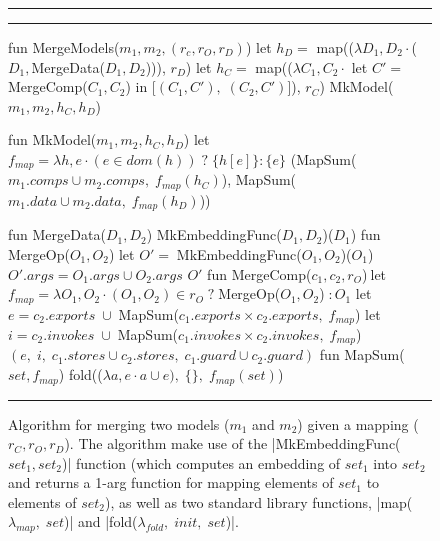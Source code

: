 
\begin{figure}[ht]
\hrule\hrule
\centering
  \begin{slangmath}[numbers=left,emph={MergeModels, MkMap, MkModel,%
                    MergeData, MergeComp, MergeOp, MapSum}]
fun MergeModels($m_1, m_2, (r_c,r_O,r_D)$)
  let $h_D=$ map(($\lambda D_1,D_2 \cdot$($D_1,$MergeData($D_1, D_2$))), $r_D$)
  let $h_C=$ map(($\lambda C_1,C_2 \cdot$ let $C'=\; $MergeComp($C_1, C_2$) in [$(C_1, C'),\; (C_2, C')$]), $r_C$)
  MkModel($m_1, m_2, h_C, h_D$)

fun MkModel($m_1, m_2, h_C, h_D$)
  let $f_{map} = \lambda h,e \cdot (e \in dom(h)) \;?\; \{h[e]\} : \{e\}$
  (MapSum($m_1.comps \cup m_2.comps,\; f_{map}(h_C)$), MapSum($m_1.data \cup m_2.data,\; f_{map}(h_D)$))

fun MergeData($D_1, D_2$)       \eqv MkEmbeddingFunc($D_1, D_2$)($D_1$)
fun MergeOp($O_1, O_2$)         \eqv let $O'=\; $MkEmbeddingFunc($O_1, O_2$)($O_1$)
                        $O'.args= O_1.args \cup O_2.args$ 
                        $O'$
fun MergeComp($c_1, c_2, r_O$)$\:$\eqv let $f_{map} = \lambda O_1,O_2 \cdot (O_1,O_2)\in r_O\;?\;$MergeOp($O_1,O_2$)$\;: O_1$
                        let $e = c_2.exports\;\cup\;$MapSum($c_1.exports \times c_2.exports,\; f_{map}$)
                        let $i = c_2.invokes\;\cup\;$MapSum($c_1.invokes \times c_2.invokes,\; f_{map}$)
                        $(e,\; i,\; c_1.stores \cup c_2.stores,\; c_1.guard \cup c_2.guard)$
fun MapSum($set, f_{map}$)          \eqv fold(($\lambda a, e \cdot a \cup e),\; \{\},\; f_{map}(set)$)
  \end{slangmath}
\hrule\vskip7pt
\caption{Algorithm for merging two models ($m_1$ and $m_2$) given a
  mapping ($r_C, r_O, r_D$).  The algorithm make use of the
  \slangmathinscript|MkEmbeddingFunc($set_1, set_2$)| function (which
  computes an embedding of $set_1$ into $set_2$ and returns a 1-arg
  function for mapping elements of $set_1$ to elements of $set_2$), as
  well as two standard library functions,
  \slangmathinscript|map($\lambda_{map},\; set$)| and
  \slangmathinscript|fold($\lambda_{fold},\; init,\; set$)|.}
\label{fig-merge-models-func}
\end{figure}
